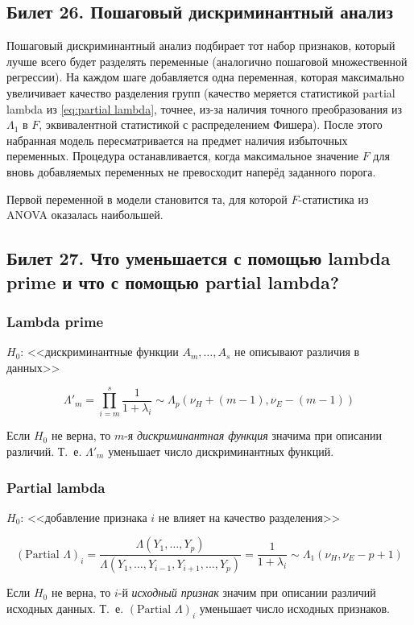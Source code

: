 \subsection{Билет 26. Пошаговый дискриминантный анализ}
	Пошаговый дискриминантный анализ подбирает тот набор признаков, который лучше всего будет разделять переменные (аналогично пошаговой множественной регрессии). На каждом шаге добавляется одна переменная, которая максимально увеличивает качество разделения групп (качество меряется статистикой partial lambda из \eqref{eq:partial lambda}, точнее, из-за наличия точного преобразования из $\Lambda_1$ в $F$, эквивалентной статистикой с распределением Фишера). После этого набранная модель пересматривается на предмет наличия избыточных переменных. Процедура останавливается, когда максимальное значение $F$ для вновь добавляемых переменных не превосходит наперёд заданного порога.

	Первой переменной в модели становится та, для которой $F$-статистика из ANOVA оказалась наибольшей.

\subsection{Билет 27. Что уменьшается с помощью lambda prime и что с помощью partial lambda?}
	\subsubsection{Lambda prime}
		$H_0$: <<дискриминантные функции $A_m, \ldots, A_s$ не описывают различия в данных>>
		
		$$\Lambda'_m = \prod_{i=m}^s \frac{1}{1+\lambda_i} \sim \Lambda_p\left(\nu_H + (m-1), \nu_E - (m-1)\right)$$

		Если $H_0$ не верна, то $m$-я \emph{дискриминантная функция} значима при описании различий. Т.~е. $\Lambda'_m$ уменьшает число дискриминантных функций.

	\subsubsection{Partial lambda}
		$H_0$: <<добавление признака $i$ не влияет на качество разделения>>

		$$\left(\text{Partial } \Lambda\right)_i = \frac{\Lambda\left(Y_1,\ldots, Y_p\right)}{\Lambda\left(Y_1,\ldots,Y_{i-1}, Y_{i+1}, \ldots, Y_p\right)} = \frac{1}{1 + \lambda_i}\sim \Lambda_1\left(\nu_H, \nu_E - p +1\right)$$

		Если $H_0$ не верна, то $i$-й \emph{исходный признак }значим при описании различий исходных данных. Т.~е. $\left(\text{Partial } \Lambda\right)_i$ уменьшает число исходных признаков.


% 